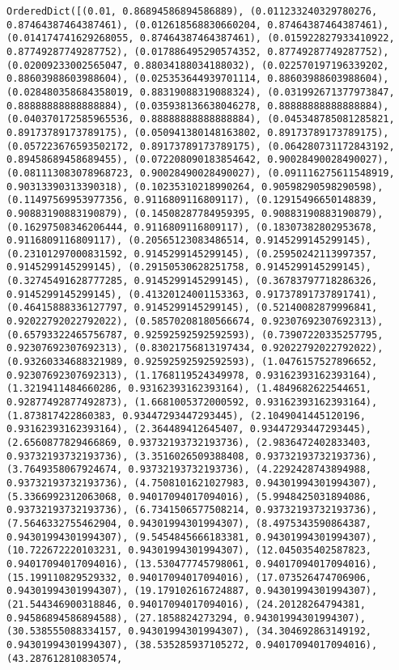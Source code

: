 \documentclass[11pt]{article}
\begin{document}
    \begin{Verbatim}[commandchars=\\\{\}]
OrderedDict([(0.01, 0.86894586894586889), (0.011233240329780276, 0.87464387464387461), (0.012618568830660204, 0.87464387464387461), (0.014174741629268055, 0.87464387464387461), (0.015922827933410922, 0.87749287749287752), (0.017886495290574352, 0.87749287749287752), (0.02009233002565047, 0.88034188034188032), (0.022570197196339202, 0.88603988603988604), (0.025353644939701114, 0.88603988603988604), (0.028480358684358019, 0.88319088319088324), (0.031992671377973847, 0.88888888888888884), (0.035938136638046278, 0.88888888888888884), (0.040370172585965536, 0.88888888888888884), (0.045348785081285821, 0.89173789173789175), (0.050941380148163802, 0.89173789173789175), (0.057223676593502172, 0.89173789173789175), (0.064280731172843192, 0.89458689458689455), (0.072208090183854642, 0.90028490028490027), (0.081113083078968723, 0.90028490028490027), (0.091116275611548919, 0.90313390313390318), (0.10235310218990264, 0.90598290598290598), (0.11497569953977356, 0.9116809116809117), (0.12915496650148839, 0.90883190883190879), (0.14508287784959395, 0.90883190883190879), (0.16297508346206444, 0.9116809116809117), (0.18307382802953678, 0.9116809116809117), (0.20565123083486514, 0.9145299145299145), (0.23101297000831592, 0.9145299145299145), (0.25950242113997357, 0.9145299145299145), (0.29150530628251758, 0.9145299145299145), (0.32745491628777285, 0.9145299145299145), (0.36783797718286326, 0.9145299145299145), (0.41320124001153363, 0.91737891737891741), (0.46415888336127797, 0.9145299145299145), (0.52140082879996841, 0.92022792022792022), (0.58570208180566674, 0.92307692307692313), (0.65793322465756787, 0.92592592592592593), (0.73907220335257795, 0.92307692307692313), (0.83021756813197434, 0.92022792022792022), (0.93260334688321989, 0.92592592592592593), (1.0476157527896652, 0.92307692307692313), (1.1768119524349978, 0.93162393162393164), (1.3219411484660286, 0.93162393162393164), (1.4849682622544651, 0.92877492877492873), (1.6681005372000592, 0.93162393162393164), (1.873817422860383, 0.93447293447293445), (2.1049041445120196, 0.93162393162393164), (2.364489412645407, 0.93447293447293445), (2.6560877829466869, 0.93732193732193736), (2.9836472402833403, 0.93732193732193736), (3.3516026509388408, 0.93732193732193736), (3.7649358067924674, 0.93732193732193736), (4.2292428743894988, 0.93732193732193736), (4.7508101621027983, 0.94301994301994307), (5.3366992312063068, 0.94017094017094016), (5.9948425031894086, 0.93732193732193736), (6.7341506577508214, 0.93732193732193736), (7.5646332755462904, 0.94301994301994307), (8.4975343590864387, 0.94301994301994307), (9.5454845666183381, 0.94301994301994307), (10.722672220103231, 0.94301994301994307), (12.045035402587823, 0.94017094017094016), (13.530477745798061, 0.94017094017094016), (15.199110829529332, 0.94017094017094016), (17.073526474706906, 0.94301994301994307), (19.179102616724887, 0.94301994301994307), (21.544346900318846, 0.94017094017094016), (24.20128264794381, 0.94586894586894588), (27.1858824273294, 0.94301994301994307), (30.538555088334157, 0.94301994301994307), (34.304692863149192, 0.94301994301994307), (38.535285937105272, 0.94017094017094016), (43.287612810830574, 
\end{Verbatim}
\end{document}
